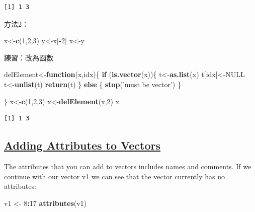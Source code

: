 \documentclass[]{book}
\newenvironment{Shaded}{\begin{snugshade}}{\end{snugshade}}
\newcommand{\ControlFlowTok}[1]{\textcolor[rgb]{0.13,0.29,0.53}{\textbf{#1}}}
\newcommand{\DecValTok}[1]{\textcolor[rgb]{0.00,0.00,0.81}{#1}}
\newcommand{\KeywordTok}[1]{\textcolor[rgb]{0.13,0.29,0.53}{\textbf{#1}}}
\newcommand{\NormalTok}[1]{#1}
\newcommand{\OperatorTok}[1]{\textcolor[rgb]{0.81,0.36,0.00}{\textbf{#1}}}
\newcommand{\OtherTok}[1]{\textcolor[rgb]{0.56,0.35,0.01}{#1}}
\newcommand{\StringTok}[1]{\textcolor[rgb]{0.31,0.60,0.02}{#1}}
\theoremstyle{definition}
\theoremstyle{definition}
\theoremstyle{definition}
\theoremstyle{remark}
\begin{document}
\begin{verbatim}
[1] 1 3
\end{verbatim}

方法2：

\begin{Shaded}
\begin{Highlighting}[]
\NormalTok{x<-}\KeywordTok{c}\NormalTok{(}\DecValTok{1}\NormalTok{,}\DecValTok{2}\NormalTok{,}\DecValTok{3}\NormalTok{)}
\NormalTok{y<-x[}\OperatorTok{-}\DecValTok{2}\NormalTok{]}
\NormalTok{x<-y}
\end{Highlighting}
\end{Shaded}

練習：改為函數

\begin{Shaded}
\begin{Highlighting}[]
\NormalTok{delElement<-}\ControlFlowTok{function}\NormalTok{(x,idx)\{}
  \ControlFlowTok{if}\NormalTok{ (}\KeywordTok{is.vector}\NormalTok{(x))\{}
\NormalTok{    t<-}\KeywordTok{as.list}\NormalTok{(x)}
\NormalTok{    t[idx]<-}\OtherTok{NULL}
\NormalTok{    t<-}\KeywordTok{unlist}\NormalTok{(t)}
    \KeywordTok{return}\NormalTok{(t) }
\NormalTok{  \} }\ControlFlowTok{else}\NormalTok{ \{}
    \KeywordTok{stop}\NormalTok{(}\StringTok{'must be vector'}\NormalTok{)}
\NormalTok{  \}}

\NormalTok{\}}
\NormalTok{x<-}\KeywordTok{c}\NormalTok{(}\DecValTok{1}\NormalTok{,}\DecValTok{2}\NormalTok{,}\DecValTok{3}\NormalTok{)}
\NormalTok{x<-}\KeywordTok{delElement}\NormalTok{(x,}\DecValTok{2}\NormalTok{)}
\NormalTok{x}
\end{Highlighting}
\end{Shaded}

\begin{verbatim}
[1] 1 3
\end{verbatim}

\hypertarget{adding-attributes-to-vectors}{%
\subsection{\texorpdfstring{\href{http://uc-r.github.io/vectors_attributes}{Adding
Attributes to
Vectors}}{Adding Attributes to Vectors}}\label{adding-attributes-to-vectors}}

The attributes that you can add to vectors includes names and comments.
If we continue with our vector v1 we can see that the vector currently
has no attributes:

\begin{Shaded}
\begin{Highlighting}[]
\NormalTok{v1 <-}\StringTok{ }\DecValTok{8}\OperatorTok{:}\DecValTok{17}
\KeywordTok{attributes}\NormalTok{(v1)}
\end{Highlighting}
\end{Shaded}
\end{document}
